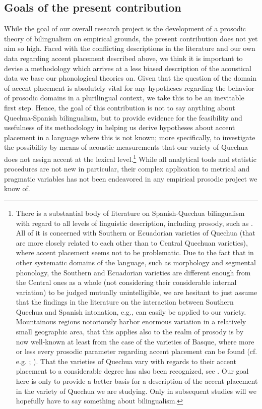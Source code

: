 \documentclass[output=paper]{LSP/langsci}
\begin{document}
\subsection{Goals of the present contribution}
While the goal of our overall research project is the development of a prosodic theory of bilingualism on empirical grounds, the present contribution does not yet aim so high. Faced with the conflicting descriptions in the literature and our own data regarding accent placement described above, we think it is important to devise a methodology which arrives at a less biased description of the acoustical data we base our phonological theories on. Given that the question of the domain of accent placement is absolutely vital for any hypotheses regarding the behavior of prosodic domains in a plurilingual context, we take this to be an inevitable first step. Hence, the goal of this contribution is not to say anything about Quechua-Spanish bilingualism, but to provide evidence for the feasibility and usefulness of its methodology in helping us derive hypotheses about accent placement in a language where this is not known; more specifically, to investigate the possibility by means of acoustic measurements that our variety of Quechua does not assign accent at the lexical level.\footnote{There is a substantial body of literature on Spanish-Quechua bilingualism with regard to all levels of linguistic description, including prosody, such as \citet{ORourke2005,ORourke2007,ORourke2008,ORourke2009,Muntendam2010,ORourke2010,ORourke2012,Muntendam2012a,Muntendam2012b,Rijswijk2014,Muntendam2016,Muysken2016}. All of it is concerned with Southern or Ecuadorian varieties of Quechua (that are more closely related to each other than to Central Quechuan varieties), where accent placement seems not to be problematic. Due to the fact that in other systematic domains of the language, such as morphology and segmental phonology, the Southern and Ecuadorian varieties are different enough from the Central ones as a whole (not considering their considerable internal variation) to be judged mutually unintelligible, we are hesitant to just assume that the findings in the literature on the interaction between Southern Quechua and Spanish intonation, e.g., can easily be applied to our variety. Mountainous regions notoriously harbor enormous variation in a relatively small geographic area, that this applies also to the realm of prosody is by now well-known at least from the case of the varieties of Basque, where more or less every prosodic parameter regarding accent placement can be found (cf. e.g. \citealt{Hualde2008basque}; \citealt{Hulst2010,Aurrekoetxea.2012}). That the varieties of Quechua vary with regards to their accent placement to a considerable degree has also been recognized, see \citet{Wetzels2010}. Our goal here is only to provide a better basis for a description of the accent placement in the variety of Quechua we are studying. Only in subsequent studies will we hopefully have to say something about bilingualism.}  While all analytical tools and statistic procedures are not new in particular, their complex application to metrical and pragmatic variables has not been endeavored in any empirical prosodic project we know of.
\end{document}
